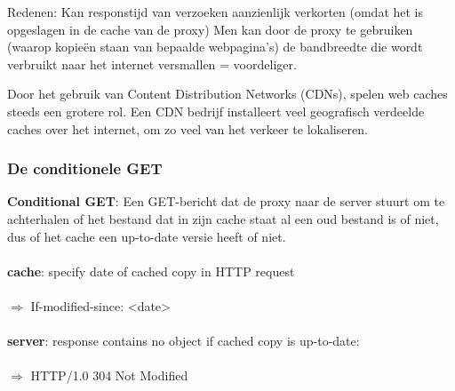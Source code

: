 \noindent Redenen:
\bi
\itf Kan responstijd van verzoeken aanzienlijk verkorten (omdat het is opgeslagen in de cache van de proxy)
\itf Men kan door de proxy te gebruiken (waarop kopieën staan van bepaalde webpagina’s) de bandbreedte die wordt verbruikt naar het internet versmallen = voordeliger.
\ei

\noindent Door het gebruik van Content Distribution Networks (CDNs), spelen web caches steeds een grotere rol. Een CDN bedrijf installeert veel geografisch verdeelde caches over het internet, om zo veel van het verkeer te lokaliseren.

\subsubsection{De conditionele GET}

\textbf{Conditional GET}: Een GET-bericht dat de proxy naar de server stuurt om te achterhalen of het bestand dat in zijn cache staat al een oud bestand is of niet, dus of het cache een up-to-date versie heeft of niet.\\\\
\textbf{cache}: specify date of cached copy in HTTP request\\\\
$\Rightarrow$ If-modified-since: <date>\\\\
\textbf{server}: response contains no object if cached copy is up-to-date:\\\\
$\Rightarrow$ HTTP/1.0 304 Not Modified
